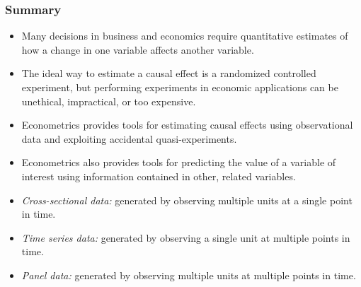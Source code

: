 

\begin{frame}
\frametitle{Summary}
\begin{itemize}
\item Many decisions in business and economics require quantitative estimates of how a change in one variable affects another variable.
\item The ideal way to estimate a causal effect is a randomized controlled experiment, but performing experiments in economic applications can be unethical, impractical, or too expensive.
\item Econometrics provides tools for estimating causal effects using observational data and exploiting accidental quasi-experiments.
\item Econometrics also provides tools for predicting the value of a variable of interest using information contained in other, related variables.
\item \emph{Cross-sectional data:} generated by observing multiple units at a single point in time. 
\item \emph{Time series data:} generated by observing a single unit at multiple points in time. 
\item \emph{Panel data:} generated by observing multiple units at multiple points in time.
\end{itemize}
\end{frame}



